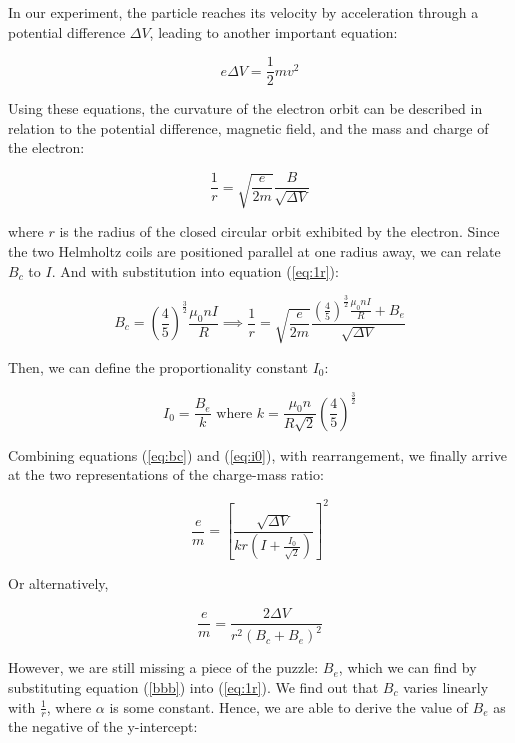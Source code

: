 \documentclass[12pt]{article}
\begin{document}
In our experiment, the particle reaches its velocity by acceleration through a potential difference $\Delta V$, leading to another important equation:

\begin{equation}
    e\Delta V = \frac{1}{2} m v^{2}
    \label{eq:e}
\end{equation}

Using these equations, the curvature of the electron orbit can be described in relation to the potential difference, magnetic field, and the mass and charge of the electron:

\begin{equation}
    \frac{1}{r} = \sqrt{\frac{e}{2m}} \frac{B}{\sqrt{\Delta V}}
    \label{eq:1r}
\end{equation}

where $r$ is the radius of the closed circular orbit exhibited by the electron. Since the two Helmholtz coils are positioned parallel at one radius away, we can relate $B_c$ to $I$. And with substitution into equation (\ref{eq:1r}):

\begin{equation}
    B_c=\left(\frac{4}{5}\right)^\frac{3}{2}\frac{\mu_0nI}{R}\implies \frac{1}{r} = \sqrt{\frac{e}{2m}} \frac{\left(\frac{4}{5}\right)^\frac{3}{2}\frac{\mu_0nI}{R}+B_e}{\sqrt{\Delta V}}
    \label{eq:bc}
\end{equation}

Then, we can define the proportionality constant $I_0$:

\begin{equation}
    I_0=\frac{B_e}{k} \text{ where } k=\frac{\mu_0n}{R\sqrt2}\left(\frac{4}{5}\right)^\frac{3}{2}
    \label{eq:i0}
\end{equation}

Combining equations (\ref{eq:bc}) and (\ref{eq:i0}), with rearrangement, we finally arrive at the two representations of the charge-mass ratio:

\begin{equation}
    \boxed{\frac{e}{m}=\left[\frac{\sqrt{\Delta V}}{kr\left(I+\frac{I_0}{\sqrt2}\right)}\right]^2}
    \label{eq:em}
\end{equation}

Or alternatively,

\begin{equation}
    \boxed{\frac{e}{m}=\frac{2\Delta V}{r^2(B_c+B_e)^2}}
    \label{eq:em2}
\end{equation}

However, we are still missing a piece of the puzzle: $B_e$, which we can find by substituting equation (\ref{bbb}) into (\ref{eq:1r}). We find out that $B_c$ varies linearly with $\frac{1}{r}$, where $\alpha$ is some constant. Hence, we are able to derive the value of $B_e$ as the negative of the y-intercept:
\end{document}
